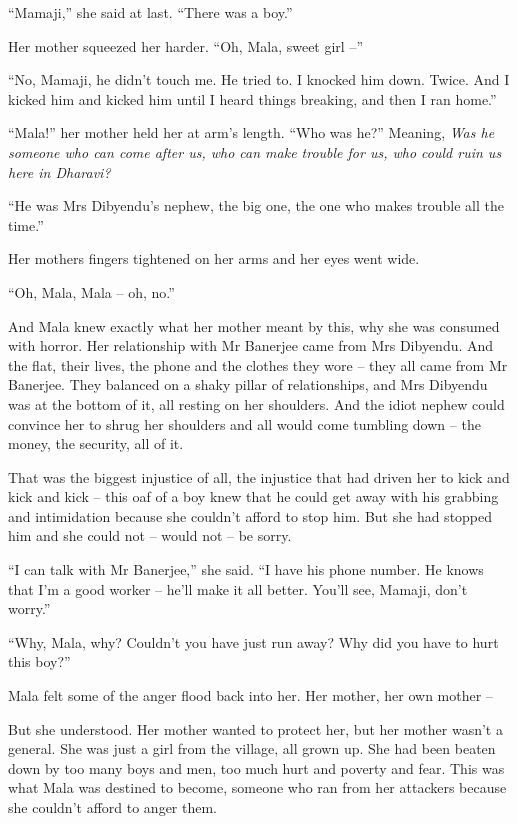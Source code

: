 ``Mamaji,'' she said at last. ``There was a boy.''

Her mother squeezed her harder. ``Oh, Mala, sweet girl --''

``No, Mamaji, he didn't touch me. He tried to. I knocked him down.
Twice. And I kicked him and kicked him until I heard things
breaking, and then I ran home.''

``Mala!'' her mother held her at arm's length. ``Who was he?'' Meaning,
\emph{Was he someone who can come after us, who can make trouble for us, who could ruin us here in Dharavi?}

``He was Mrs Dibyendu's nephew, the big one, the one who makes
trouble all the time.''

Her mothers fingers tightened on her arms and her eyes went wide.

``Oh, Mala, Mala -- oh, no.''

And Mala knew exactly what her mother meant by this, why she was
consumed with horror. Her relationship with Mr Banerjee came from
Mrs Dibyendu. And the flat, their lives, the phone and the clothes
they wore -- they all came from Mr Banerjee. They balanced on a
shaky pillar of relationships, and Mrs Dibyendu was at the bottom
of it, all resting on her shoulders. And the idiot nephew could
convince her to shrug her shoulders and all would come tumbling
down -- the money, the security, all of it.

That was the biggest injustice of all, the injustice that had
driven her to kick and kick and kick -- this oaf of a boy knew that
he could get away with his grabbing and intimidation because she
couldn't afford to stop him. But she had stopped him and she could
not -- would not -- be sorry.

``I can talk with Mr Banerjee,'' she said. ``I have his phone number.
He knows that I'm a good worker -- he'll make it all better. You'll
see, Mamaji, don't worry.''

``Why, Mala, why? Couldn't you have just run away? Why did you have
to hurt this boy?''

Mala felt some of the anger flood back into her. Her mother, her
own mother --

But she understood. Her mother wanted to protect her, but her
mother wasn't a general. She was just a girl from the village, all
grown up. She had been beaten down by too many boys and men, too
much hurt and poverty and fear. This was what Mala was destined to
become, someone who ran from her attackers because she couldn't
afford to anger them.

